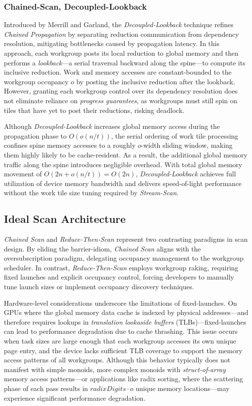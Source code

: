 \documentclass[sigconf]{acmart}
\begin{document}
\subsubsection{Chained-Scan, Decoupled-Lookback}
Introduced by Merrill and Garland, the \emph{Decoupled-Lookback} technique refines \emph{Chained Propagation} by separating reduction communication from dependency resolution, mitigating bottlenecks caused by propagation latency. In this approach, each workgroup posts its local reduction to global memory and then performs a \emph{lookback}---a serial traversal backward along the spine---to compute its inclusive reduction. Work and memory accesses are constant-bounded to the workgroup occupancy $o$ by posting the inclusive reduction after the lookback. However, granting each workgroup control over its dependency resolution does not eliminate reliance on \emph{progress guarantees}, as workgroups must still spin on tiles that have yet to post their reductions, risking deadlock.

Although \emph{Decoupled-Lookback} increases global memory access during the propagation phase to $O(o(n/t))$, the serial ordering of work tile processing confines spine memory accesses to a roughly $o$-width sliding window, making them highly likely to be cache-resident. As a result, the additional global memory traffic along the spine introduces negligible overhead. With total global memory movement of $O(2n+o(n/t))= O(2n)$, \emph{Decoupled-Lookback} achieves full utilization of device memory bandwidth and delivers speed-of-light performance without the work tile size tuning required by \emph{Stream-Scan}.

\subsection{Ideal Scan Architecture}
\emph{Chained Scan} and \emph{Reduce-Then-Scan} represent two contrasting paradigms in scan design. By eliding the barrier-idiom, \emph{Chained Scan} aligns with the oversubscription paradigm, delegating occupancy management to the workgroup scheduler. In contrast, \emph{Reduce-Then-Scan} employs workgroup raking, requiring fixed launches and explicit occupancy control, forcing developers to manually tune launch sizes or implement occupancy discovery techniques.

Hardware-level considerations underscore the limitations of fixed-launches. On GPUs where the global memory data cache is indexed by physical addresses---and therefore requires lookups in \emph{translation lookaside buffers} (TLBs)---fixed-launches can lead to performance degradation due to cache thrashing. This issue occurs when task sizes are large enough that each workgroup accesses its own unique page entry, and the device lacks sufficient TLB coverage to support the memory access patterns of all workgroups. Although this behavior typically does not manifest with simple monoids, more complex monoids with \emph{struct-of-array} memory access patterns---or applications like radix sorting, where the scattering phase of each pass results in $radixDigits \cdot o$ unique memory locations---may experience significant performance degradation.
\end{document}
